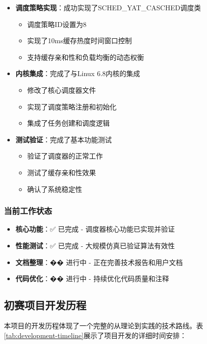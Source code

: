 \begin{itemize}
    \item \textbf{调度策略实现}：成功实现了SCHED\_YAT\_CASCHED调度类
    \begin{itemize}
        \item 调度策略ID设置为8
        \item 实现了10ms缓存热度时间窗口控制
        \item 支持缓存亲和性和负载均衡的动态权衡
    \end{itemize}
    \item \textbf{内核集成}：完成了与Linux 6.8内核的集成
    \begin{itemize}
        \item 修改了核心调度器文件
        \item 实现了调度策略注册和初始化
        \item 集成了任务创建和调度逻辑
    \end{itemize}
    \item \textbf{测试验证}：完成了基本功能测试
    \begin{itemize}
        \item 验证了调度器的正常工作
        \item 测试了缓存亲和性效果
        \item 确认了系统稳定性
    \end{itemize}
\end{itemize}

\subsubsection{当前工作状态}

\begin{itemize}
    \item \textbf{核心功能}：✅ 已完成 - 调度器核心功能已实现并验证
    \item \textbf{性能测试}：✅ 已完成 - 大规模仿真已验证算法有效性
    \item \textbf{文档整理}：�� 进行中 - 正在完善技术报告和用户文档
    \item \textbf{代码优化}：�� 进行中 - 持续优化代码质量和注释
\end{itemize}

\subsection{初赛项目开发历程}

本项目的开发历程体现了一个完整的从理论到实践的技术路线。表\ref{tab:development-timeline}展示了项目开发的详细时间安排：

